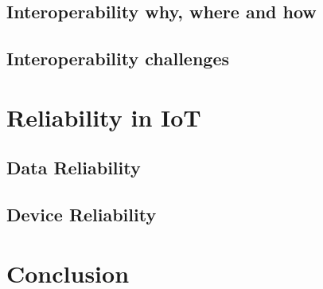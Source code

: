 \subsection{Interoperability why, where and how}
\subsection{Interoperability challenges}
\section{Reliability in IoT}
\subsection{Data Reliability}
\subsection{Device Reliability}
\section{Conclusion}
